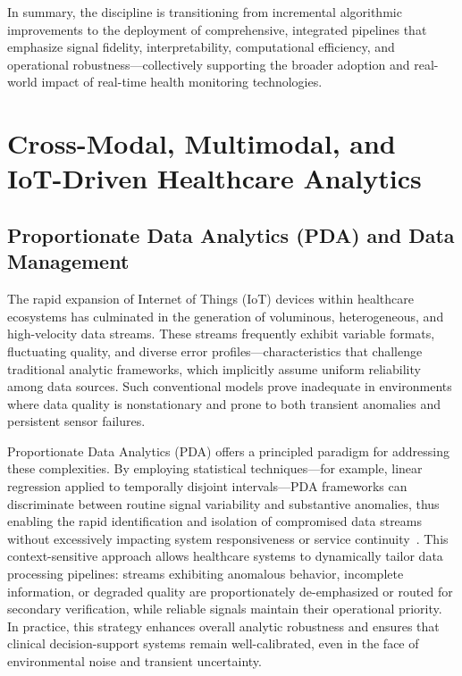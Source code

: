 In summary, the discipline is transitioning from incremental algorithmic improvements to the deployment of comprehensive, integrated pipelines that emphasize signal fidelity, interpretability, computational efficiency, and operational robustness—collectively supporting the broader adoption and real-world impact of real-time health monitoring technologies.

\section{Cross-Modal, Multimodal, and IoT-Driven Healthcare Analytics}

\subsection{Proportionate Data Analytics (PDA) and Data Management}

The rapid expansion of Internet of Things (IoT) devices within healthcare ecosystems has culminated in the generation of voluminous, heterogeneous, and high-velocity data streams. These streams frequently exhibit variable formats, fluctuating quality, and diverse error profiles---characteristics that challenge traditional analytic frameworks, which implicitly assume uniform reliability among data sources. Such conventional models prove inadequate in environments where data quality is nonstationary and prone to both transient anomalies and persistent sensor failures. 

Proportionate Data Analytics (PDA) offers a principled paradigm for addressing these complexities. By employing statistical techniques---for example, linear regression applied to temporally disjoint intervals---PDA frameworks can discriminate between routine signal variability and substantive anomalies, thus enabling the rapid identification and isolation of compromised data streams without excessively impacting system responsiveness or service continuity~\cite{ref106}. This context-sensitive approach allows healthcare systems to dynamically tailor data processing pipelines: streams exhibiting anomalous behavior, incomplete information, or degraded quality are proportionately de-emphasized or routed for secondary verification, while reliable signals maintain their operational priority. In practice, this strategy enhances overall analytic robustness and ensures that clinical decision-support systems remain well-calibrated, even in the face of environmental noise and transient uncertainty.

